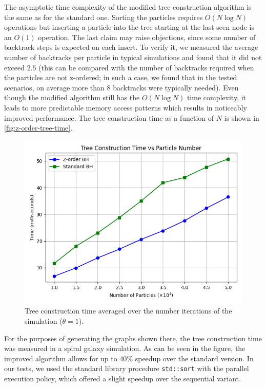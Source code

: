 The asymptotic time complexity of the modified tree construction algorithm is the same as for the standard one.
Sorting the particles requires $O(N\log N)$ operations but inserting a particle into the tree starting at the last-seen node is an $O(1)$ operation.
The last claim may raise objections, since some number of backtrack steps is expected on each insert.
To verify it, we measured the average number of backtracks per particle in typical simulations and found that it did not exceed $2.5$ (this can be compared with the number of backtracks required when the particles are not z-ordered; in such a case, we found that in the tested scenarios, on average more than 8 backtracks were typically needed).
Even though the modified algorithm still has the $O(N\log N)$ time complexity, it leads to more predictable memory access patterns which results in noticeably improved performance.
The tree construction time as a function of $N$ is shown in \autoref{fig:z-order-tree-time}.
\begin{figure}[htp]
    \centering
    \includegraphics[scale=0.5]{chapters/barnes-hut/img/tree_construction_time.png}
    \caption{Tree construction time averaged over the number iterations of the simulation ($\theta = 1$).}
    \label{fig:z-order-tree-time}
\end{figure}
For the purposes of generating the graphs shown there, the tree construction time was measured in a spiral galaxy simulation.
As can be seen in the figure, the improved algorithm allows for up to $40\%$ speedup over the standard version.
In our tests, we used the standard library procedure \texttt{std::sort} with the parallel execution policy, which offered a slight speedup over the sequential variant.